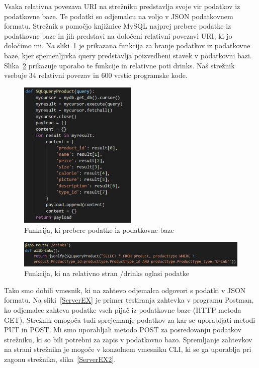 \documentclass[a4paper, 12pt]{book}
\begin{document}
Vsaka relativna povezava URI na strežniku predstavlja svoje vir podatkov iz podatkovne baze. Te podatki so odjemalcu na voljo v JSON podatkovnem formatu. Strežnik s pomočjo knjižnice MySQL najprej prebere podatke iz podatkovne baze in jih predstavi na določeni relativni povezavi URI, ki jo določimo mi. Na sliki~\ref{Drinks_DB_function} je prikazana funkcija za branje podatkov iz podatkovne baze, kjer spemenljivka query predstavlja poizvedbeni stavek v podatkovni bazi. Slika~\ref{Drinks_URI} prikazuje uporabo te funkcije in relativne poti drinks. Naš strežnik vsebuje 34 relativni povezav in 600 vrstic programske kode.


\begin{figure}[!htb]
\begin{center}
\includegraphics[width=0.5\textwidth]{drinks_1.jpg}
\caption{Funkcija, ki prebere podatke iz podatkovne baze}
\label{Drinks_DB_function}
\end{center}
\end{figure}

\begin{figure}[!htb]
\begin{center}
\includegraphics[width=14cm]{drinks_2.jpg}
\caption{Funkcija, ki na relativno stran /drinks oglasi podatke}
\label{Drinks_URI}
\end{center}
\end{figure}

Tako smo dobili vmesnik, ki na zahtevo odjemalca odgovori s podatki v JSON formatu. Na sliki~\ref{ServerEX} je primer testiranja zahtevka v programu Postman, ko odjemalec zahteva podatke vseh pijač iz podatkovne baze (HTTP metoda GET). Strežnik omogoča tudi sprejemanje podatkov za kar se uporabljati metodi PUT in POST. Mi smo uporabljali metodo POST za posredovanju podatkov strežniku, ki so bili potrebni za zapis v podatkovno bazo. Spremljanje zahtevkov na strani strežnika je mogoče v konzolnem vmesniku CLI, ki se ga uporablja pri zagonu strežnika, slika~\ref{ServerEX2}.
\end{document}
